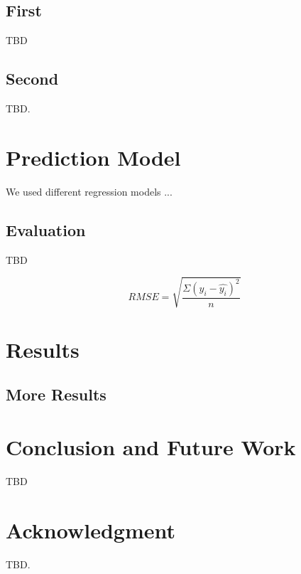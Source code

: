 \documentclass[conference]{IEEEtran}
\begin{document}
\subsection{First}
TBD
\subsection{Second}
TBD. 



\section{Prediction Model}
\label{sec:models}
We used different regression models ...

\subsection{Evaluation}
TBD


\[
    RMSE=\sqrt{\frac{\Sigma(y_i-\hat{y_i})^2}{n}}
\]





\section{Results}
\label{sec:results}



\subsection{More Results}





\section{Conclusion and Future Work}
\label{sec:conclusion}

TBD
\section*{Acknowledgment}
TBD.




\end{document}
